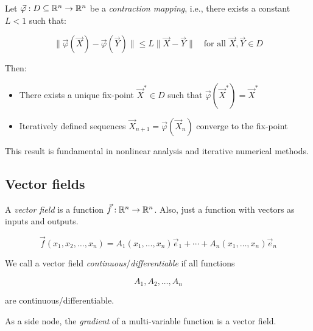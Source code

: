 Let \( \vec{\varphi} : D \subseteq \mathbb{R}^n \to \mathbb{R}^n \) be a \emph{contraction mapping}, 
i.e., there exists a constant \( L < 1 \) such that:

\[
    \|\vec{\varphi}(\vec{X}) - \vec{\varphi}(\vec{Y})\| \le L \|\vec{X} - \vec{Y}\| \quad 
    \text{for all } \vec{X}, \vec{Y} \in D
\]

Then:

\begin{itemize}
    \item There exists a unique fix-point \( \vec{X}^* \in D \) such that 
    \( \vec{\varphi}(\vec{X}^*) = \vec{X}^* \)
    \item Iteratively defined sequences \( \vec{X}_{n+1} = \vec{\varphi}(\vec{X}_n) \) converge to the 
    fix-point
\end{itemize}

This result is fundamental in nonlinear analysis and iterative numerical methods.

\subsection{Vector fields}

A \emph{vector field} is a function \(\vec{f}: \mathbb{R}^n \to \mathbb{R}^n\). Also, just a 
function with vectors as inputs and outputs.

\[
    \vec{f}(x_1, x_2, \dots, x_n) = A_1(x_1, \dots, x_n)\vec{e}_1 + \cdots + A_n(x_1, \dots, x_n)\vec{e}_n
\]

We call a vector field \emph{continuous}/\emph{differentiable} if all functions 

\[
    A_1, A_2, \dots, A_n
\] 

are continuous/differentiable.
\vspace{\baselineskip}

As a side node, the \emph{gradient} of a multi-variable function is a vector field.



